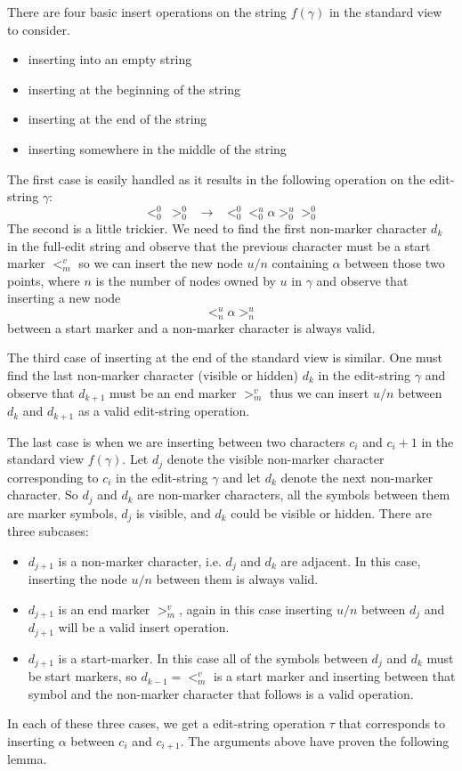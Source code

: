\documentclass{amsart}
\begin{document}
There are four basic insert operations on the string $f(\gamma)$ in the standard view to consider.
\begin{itemize}
\item inserting into an empty string
\item inserting at the beginning of the string
\item inserting at the end of the string
\item inserting somewhere in the middle of the string 
\end{itemize}
The first case is easily handled as it results in the following operation on the 
edit-string $\gamma$:
\[
<^0_0\;>^0_0 \;\; \rightarrow \;\;<^0_0 <^u_0 \alpha >^u_0 >^0_0
\]
The second is a little trickier. We need to find the first non-marker character $d_k$
in the full-edit string and observe that the previous character must be a start
marker $<^v_m$ so we can insert the new node $u/n$ containing $\alpha$ between those
two points, where $n$ is the number of nodes owned by $u$ in $\gamma$ and observe
that inserting a new node 
\[
<^u_n \alpha >^u_n
\]
between a start marker and a non-marker character is always valid.

The third case of inserting at the end of the standard view is similar. One
must find the last non-marker character (visible or hidden) $d_k$ in the
edit-string $\gamma$ and observe that $d_{k+1}$ must be an end marker
$>^v_m$ thus we can insert $u/n$ between $d_k$ and $d_{k+1}$ as a valid
edit-string operation.

The last case is when we are inserting between two characters $c_i$ and $c{_i+1}$
in the standard view $f(\gamma)$. Let $d_j$ denote the visible non-marker
character corresponding to $c_i$ in the edit-string $\gamma$ and let
$d_k$ denote the next non-marker character. So $d_j$ and $d_k$ are non-marker
characters, all the symbols between them are marker symbols, $d_j$ is
visible, and $d_k$ could be visible or hidden. There are three subcases:
\begin{itemize} 
\item $d_{j+1}$ is a non-marker character, i.e. $d_j$ and $d_k$ are adjacent. 
In this case, inserting
the node $u/n$ between them is always valid.
\item $d_{j+1}$ is an end marker $>^v_m$, again in this case inserting $u/n$
between $d_j$ and $d_{j+1}$ will be a valid insert operation.
\item $d_{j+1}$ is a start-marker. In this case all of the symbols between
$d_j$ and $d_k$ must be start markers, so $d_{k-1} = <^v_m$ is a start marker
and inserting between that symbol and the non-marker character that follows
is a valid operation.
\end{itemize}
In each of these three cases, we get a edit-string operation $\tau$ that
corresponds to inserting $\alpha$ between $c_i$ and $c_{i+1}$. The arguments
above have proven the following lemma.
\end{document}
